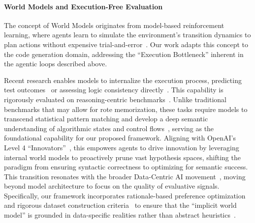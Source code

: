 \paragraph{World Models and Execution-Free Evaluation}
The concept of World Models originates from model-based reinforcement learning, where agents learn to simulate the environment's transition dynamics to plan actions without expensive trial-and-error~\cite{Ding2025, hafner2024masteringdiversedomainsworld, feng2025webworldmodels, wong2023wordmodelsworldmodels, li2025wordworldlargelanguage}.
Our work adapts this concept to the code generation domain, addressing the ``Execution Bottleneck'' inherent in the agentic loops described above.

Recent research enables models to internalize the execution process, predicting test outcomes~\cite{Hora2024predictingtestresultswithoutexecution, faircodegenteam2025cwmopenweightsllmresearch,wei2025swerladvancingllmreasoning} or assessing logic consistency directly~\cite{li2025codeiocondensingreasoningpatterns, Changshu2024codemind}.
This capability is rigorously evaluated on reasoning-centric benchmarks~\cite{wei2025equibenchbenchmarkinglargelanguage, gu2024cruxevalbenchmarkcodereasoning, jain2024livecodebenchholisticcontaminationfree}.
Unlike traditional benchmarks that may allow for rote memorization, these tasks require models to transcend statistical pattern matching and develop a deep semantic understanding of algorithmic states and control flows~\cite{chen2025scalingagentlearningexperience, sun2025zerosearchincentivizesearchcapability, akhauri2025regressionlanguagemodelscode, Chen2025reval}, serving as the foundational capability for our proposed framework.
Aligning with OpenAI's Level 4 ``Innovators''~\cite{metz2024openai, zhang2025innogymbenchmarkinginnovationpotential}, this empowers agents to drive innovation by leveraging internal world models to proactively prune vast hypothesis spaces, shifting the paradigm from ensuring syntactic correctness to optimizing for semantic success.
This transition resonates with the broader Data-Centric AI movement~\cite{zha2023datacentricartificialintelligencesurvey, cabrera2025machinelearningsystemssurvey}, moving beyond model architecture to focus on the quality of evaluative signals.
Specifically, our framework incorporates rationale-based preference optimization~\cite{Just2024datacentrichuman} and rigorous dataset construction criteria~\cite{Shen2024towardsdatacentricrlhf} to ensure that the ``implicit world model'' is grounded in data-specific realities rather than abstract heuristics~\cite{tschalzev2024datacentricperspectiveevaluatingmachine}.



